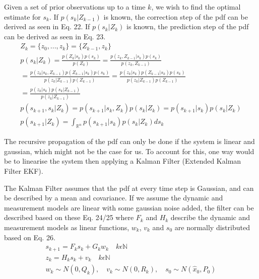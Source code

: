 \documentclass[a4paper]{IEEEtran}
\begin{document}
Given a set of prior observations up to a time $k$, we wish to find the optimal estimate for $s_{k}$. If $p(s_{k}|Z_{k-1})$ is known, the correction step of the pdf can be derived as seen in Eq. 22. If $p(s_{k}|Z_{k})$ is known, the prediction step of the pdf can be derived as seen in Eq. 23. 
\begingroup\makeatletter\def\f@size{7}\check@mathfonts
\begin{gather}
Z_{k}=\{z_{0},...,z_{k}\}=\{Z_{k-1},z_{k}\} \\
p(s_{k}|Z_{k})=\frac{p(Z_{k}|s_{k})p(s_{k})}{p(Z_{k})}=\frac{p(z_{k},Z_{k-1}|s_{k})p(s_{k})}{p(z_{k},Z_{k-1})} \nonumber\\
=\frac{p(z_{k}|s_{k},Z_{k-1})p(Z_{k-1}|s_{k})p(s_{k})}{p(z_{k}|Z_{k-1})p(Z_{k-1})}=\frac{p(z_{k}|s_{k})p(Z_{k-1}|s_{k})p(s_{k})}{p(z_{k}|Z_{k-1})p(Z_{k-1})} \nonumber\\
=\frac{p(z_{k}|s_{k})p(s_{k}|Z_{k-1})}{p(z_{k}|Z_{k-1})} \\
p(s_{k+1},s_{k}|Z_{k})=p(s_{k+1}|s_{k},Z_{k})p(s_{k}|Z_{k})=p(s_{k+1}|s_{k})p(s_{k}|Z_{k}) \nonumber\\
p(s_{k+1}|Z_{k})=\int_{\mathbb{R^{\mathit{n}}}}p(s_{k+1}|s_{k})p(s_{k}|Z_{k})ds_{k}
\end{gather}
\endgroup

The recursive propagation of the pdf can only be done if the system is linear and gaussian, which might not be the case for us. To account for this, one way would be to linearise the system then applying a Kalman Filter (Extended Kalman Filter EKF).

The Kalman Filter assumes that the pdf at every time step is Gaussian, and can be described by a mean and covariance. If we assume the dynamic and measurement models are linear with some gaussian noise added, the filter can be described based on these Eq. 24/25 where $F_{k}$ and $H_{k}$ describe the dynamic and measurement models as linear functions, $w_{k}$, $v_{k}$ and $s_{0}$ are normally distributed based on Eq. 26. 
\begingroup\makeatletter\def\f@size{7}\check@mathfonts
\begin{gather}
s_{k+1}=F_{k}s_{k}+G_{k}w_{k}\quad k\epsilon\mathbb{N} \\
z_{k}=H_{k}s_{k}+v_{k}\quad k\epsilon\mathbb{N} \\
w_{k}\sim N(0,Q_{k}),\quad v_{k}\sim N(0,R_{k}),\quad s_{0}\sim N(\hat{x}_{0},P_{0})
\end{gather}
\endgroup
\end{document}

